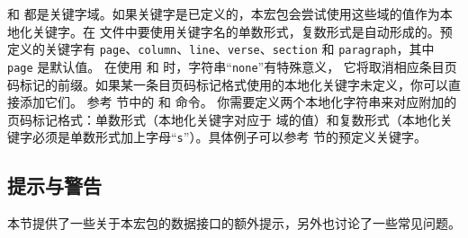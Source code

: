  和  都是关键字域。如果关键字是已定义的，本宏包会尝试使用这些域的值作为本地化关键字。在  文件中要使用关键字名的单数形式，复数形式是自动形成的。预定义的关键字有 \texttt{page}、\texttt{column}、\texttt{line}、\texttt{verse}、\texttt{section} 和 \texttt{paragraph}，其中 \texttt{page} 是默认值。
在使用  和  时，字符串“\texttt{none}”有特殊意义，
它将取消相应条目页码标记的前缀。如果某一条目页码标记格式使用的本地化关键字未定义，你可以直接添加它们。
参考  节中的  和  命令。
你需要定义两个本地化字符串来对应附加的页码标记格式：单数形式（本地化关键字对应于  域的值）和复数形式（本地化关键字必须是单数形式加上字母“\texttt{s}”）。具体例子可以参考  节的预定义关键字。

\subsection{提示与警告}
\label{bib:cav}

本节提供了一些关于本宏包的数据接口的额外提示，另外也讨论了一些常见问题。

